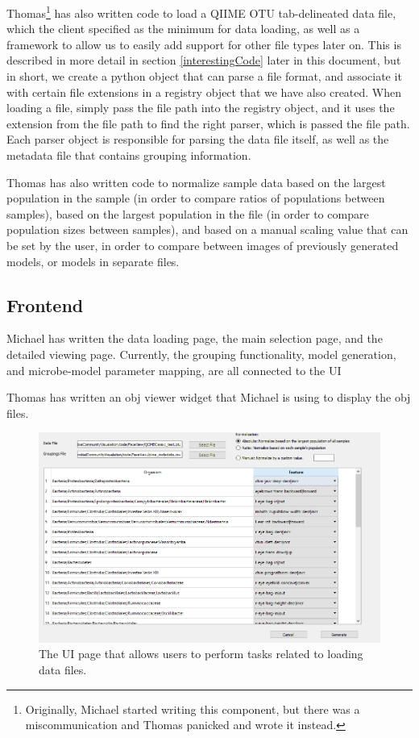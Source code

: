 \documentclass[letterpaper,10pt, onecolumn, draftclsnofoot]{IEEEtran}
\begin{document}
Thomas\footnote{Originally, Michael started writing this component, but there was a miscommunication and Thomas panicked and wrote it instead.} has also written code to load a QIIME OTU tab-delineated data file, which the client specified as the minimum for data loading, as well as a framework to allow us to easily add support for other file types later on. This is described in more detail in section \ref{interestingCode} later in this document, but in short, we create a python object that can parse a file format, and associate it with certain file extensions in a registry object that we have also created. When loading a file, simply pass the file path into the registry object, and it uses the extension from the file path to find the right parser, which is passed the file path. Each parser object is responsible for parsing the data file itself, as well as the metadata file that contains grouping information.

Thomas has also written code to normalize sample data based on the largest population in the sample (in order to compare ratios of populations between samples), based on the largest population in the file (in order to compare population sizes between samples), and based on a manual scaling value that can be set by the user, in order to compare between images of previously generated models, or models in separate files.

\subsection{Frontend}

Michael has written the data loading page, the main selection page, and the detailed viewing page. Currently, the grouping functionality, model generation, and microbe-model parameter mapping, are all connected to the UI

Thomas has written an obj viewer widget that Michael is using to display the obj files.

\begin{figure}
	\includegraphics[width=\textwidth]{loading}
	\caption{The UI page that allows users to perform tasks related to loading data files.}
	\label{fig:LoadingInterface}
\end{figure}
\end{document}
